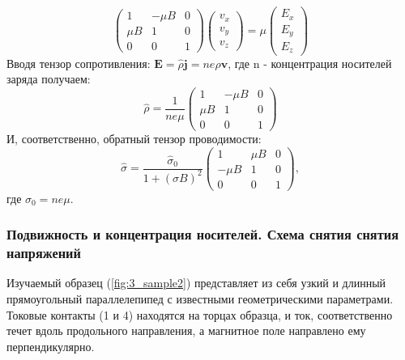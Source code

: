 \documentclass[a4paper, 12pt]{article}
\begin{document}
\begin{equation}
	\left(\begin{array}{ccc}
		1 & -\mu B & 0 \\
		\mu B & 1 & 0 \\
		0 & 0 & 1
	\end{array}\right)\left(\begin{array}{l}
		v_{x} \\
		v_{y} \\
		v_{z}
	\end{array}\right)=\mu\left(\begin{array}{l}
		E_{x} \\
		E_{y} \\
		E_{z}
	\end{array}\right)
\end{equation}
Вводя тензор сопротивления: $\textbf{E}=\hat{\rho} \textbf{j} = ne \hat{\rho}\textbf{v}$, где n - концентрация носителей заряда получаем:
\begin{equation}
	\hat{\rho}=\frac{1}{n e \mu}\left(\begin{array}{ccc}
		1 & -\mu B & 0 \\
		\mu B & 1 & 0 \\
		0 & 0 & 1
	\end{array}\right)
\end{equation}
И, соответственно, обратный тензор проводимости:
\begin{equation}
	\hat{\sigma}=\frac{\hat{\sigma}_{0}}{1+(\sigma B)^{2}}\left(\begin{array}{ccc}
		1 & \mu B & 0 \\
		-\mu B & 1 & 0 \\
		0 & 0 & 1
	\end{array}\right),
\end{equation}
где $\sigma_0=ne\mu$.

\subsubsection{Подвижность и концентрация носителей. Схема снятия снятия напряжений}
Изучаемый образец (\ref{fig:3_sample2}) представляет из себя узкий и длинный прямоугольный параллелепипед с известными геометрическими параметрами. Токовые контакты (1 и 4) находятся на торцах образца, и ток, соответственно течет вдоль продольного направления, а магнитное поле направлено ему перпендикулярно.
\end{document}
